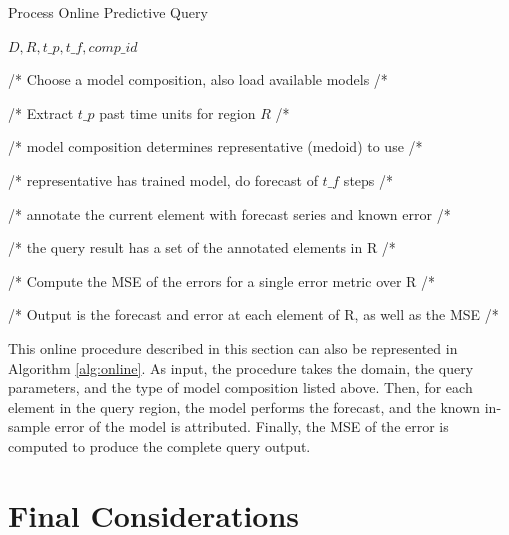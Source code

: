 \begin{algorithm}[h!]
\caption{Process Online Predictive Query}\label{alg:online}
\begin{algorithmic}[1] 
 {$D, R, t\_p, t\_f, comp\_id $}

/* Choose a model composition, also load available models /*

/* Extract $t\_p$ past time units for region $R$ /*



 /* model composition determines representative (medoid) to use /*
 
 /* representative has trained model, do forecast of $t\_f$ steps /*
 
 /* annotate the current element with forecast series and known error /*
 
 /* the query result has a set of the annotated elements in R /*
\EndFor

/* Compute the MSE of the errors for a single error metric over R /*

/* Output is the forecast and error at each element of R, as well as the MSE /* 
\EndFunction 
\end{algorithmic} 
\end{algorithm} 

This online procedure described in this section can also be represented in Algorithm \ref{alg:online}. As input, the procedure takes the domain, the query parameters, and the type of model composition listed above. Then, for each element in the query region, the model performs the forecast, and the known in-sample error of the model is attributed. Finally, the MSE of the error is computed to produce the complete query output.

\section{Final Considerations}
\label{Sec:MethodologySummary}

